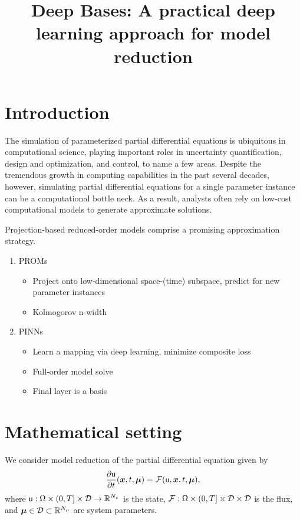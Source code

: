 \documentclass[3p,computermodern,10pt]{elsarticle}
\begin{document}
\begin{frontmatter}

\title{Deep Bases: A practical deep learning approach for model reduction}

\begin{abstract}
\end{abstract}
\end{frontmatter}


\section{Introduction}
The simulation of parameterized partial differential equations is ubiquitous in computational science, playing important roles in uncertainty quantification, design and optimization, and control, to name a few areas. Despite the tremendous growth in computing capabilities in the past several decades, however, simulating partial differential equations for a single parameter instance can be a computational bottle neck. As a result, analysts often rely on low-cost computational models to generate approximate solutions. 

Projection-based reduced-order models comprise a promising approximation strategy. 

\begin{enumerate}
\item PROMs
\begin{itemize}
\item Project onto low-dimensional space-(time) subspace, predict for new parameter instances
\item Kolmogorov n-width
\end{itemize}
\item PINNs
\begin{itemize}
\item Learn a mapping via deep learning, minimize composite loss
\item Full-order model solve
\item Final layer is a basis
\end{itemize}
\end{enumerate}  
\section{Mathematical setting}
We consider model reduction of the partial differential equation given by
\begin{equation}\label{eq:fom}
\frac{\partial \mathsf{u}}{\partial t}(\boldsymbol x, t,\boldsymbol \mu) = \mathcal{F}(\mathsf{u},\boldsymbol x, t,\boldsymbol \mu), 
\end{equation}
where $\mathsf{u}: \Omega \times (0,T] \times \mathcal{D} \rightarrow \mathbb{R}^{N_v}$ is the state, $\mathcal{F}: \Omega \times (0,T] \times \mathcal{D} \times \mathcal{D}$ is the flux, and $\boldsymbol \mu \in \mathcal{D} \subset \mathbb{R}^{N_{\mu}}$  are system parameters.
\end{document}
